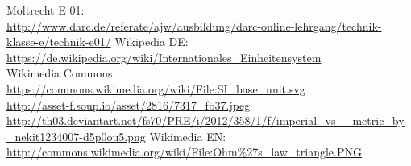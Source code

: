 \begin{thebibliography}{}
     Moltrecht E 01: \\
                    \url{http://www.darc.de/referate/ajw/ausbildung/darc-online-lehrgang/technik-klasse-e/technik-e01/}
        Wikipedia DE: \\
                    \url{https://de.wikipedia.org/wiki/Internationales_Einheitensystem}\\
        Wikimedia Commons \\
                    \url{https://commons.wikimedia.org/wiki/File:SI_base_unit.svg}\\
      \url{http://asset-f.soup.io/asset/2816/7317_fb37.jpeg}
      \url{http://th03.deviantart.net/fs70/PRE/i/2012/358/1/f/imperial_vs__metric_by_nekit1234007-d5p0ou5.png}
      Wikimedia EN:\\
                    \url{http://commons.wikimedia.org/wiki/File:Ohm\%27s_law_triangle.PNG}\\
\end{thebibliography} 


